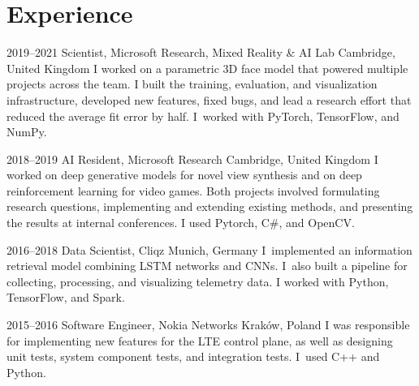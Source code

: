 \documentclass[]{friggeri-cv_osx}
\begin{document}
\vspace{5mm}
\begin{center}
\href{mailto:sebastian@dziadzio.com}{\color{gray} \Large \faEnvelope} \hspace{0.05cm}
\href{https://sebastiandziadzio.com}{\color{gray} \Large \faHome} \hspace{0.05cm}
\href{https://github.com/sebastiandziadzio}{\color{gray} \Large \faGithub} \hspace{0.05cm}
\href{https://twitter.com/sbdzdz}{\color{gray} \Large\faTwitter} \hspace{0.05cm}
\href{https://pl.linkedin.com/in/sebastiandziadzio}{\color{gray} \Large\faLinkedin} \hspace{0.05cm}
\href{https://scholar.google.com/citations?user=8vAIQXoAAAAJ&hl=en}{\color{gray} \Large\faGraduationCap} \hspace{0.05cm}
\end{center}
\vspace{2mm}

\section{Experience}
\begin{entrylist}
\entry
{2019–2021}
{Scientist, Microsoft Research, Mixed Reality \& AI Lab}
{Cambridge, United Kingdom}
{I worked on a parametric 3D face model that powered multiple projects across the team. I built the training, evaluation, and visualization infrastructure, developed new features, fixed bugs,
and lead a research effort that reduced the average fit error by half. I~worked with PyTorch, TensorFlow, and NumPy.\\}

\entry
{2018–2019}
{AI Resident, Microsoft Research}
{Cambridge, United Kingdom}
{I worked on deep generative models for novel view synthesis and on deep reinforcement learning for video games. Both projects involved
formulating research questions, implementing and extending existing methods, and presenting the results at internal conferences. I used Pytorch, C\#, and OpenCV.\\}

\entry
{2016–2018}
{Data Scientist, Cliqz}
{Munich, Germany}
{I~implemented an information retrieval model combining LSTM networks and CNNs. I~also built a pipeline for
collecting, processing, and visualizing telemetry data. I worked with Python, TensorFlow, and Spark.\\}

\entry
{2015–2016}
{Software Engineer, Nokia Networks}
{Kraków, Poland}
{I was responsible for implementing new features for the LTE control plane, as well as designing unit tests, system component tests,
and integration tests. I~used C++ and Python.\\}
\end{entrylist}
\end{document}
